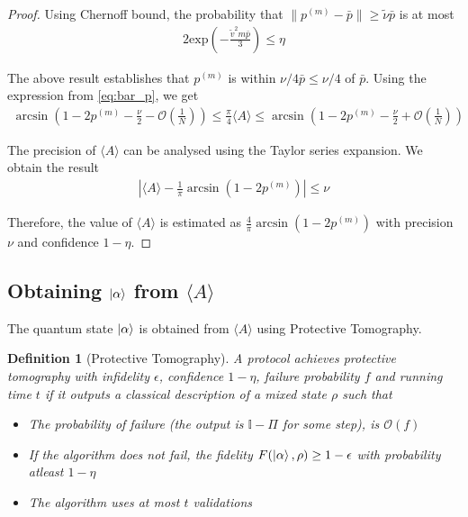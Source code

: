 \documentclass[]{article}
\newtheorem{definition}{Definition}
\newcommand{\cO}{\mathcal O}
\newcommand*{\E}[1]{\langle #1 \rangle}
\begin{document}
\begin{proof}
    Using Chernoff bound, the probability that $\| p^{(m)} - \bar p\| \geq \tilde \nu \bar p$ is at most
    \begin{align}
        2 \text{exp} \left(-\frac{\tilde v^2 m \bar p}{3} \right) \leq \eta
    \end{align}
    
    The above result establishes that $p^{(m)}$ is within $\nu/4 \bar p \leq \nu/4$ of $\bar p$. Using the expression from \ref{eq:bar_p}, we get
    \begin{align}
        \arcsin \left(1 - 2p^{(m)} - \frac{\nu}{2} - \cO \left(\frac{1}{N}\right) \right) \leq \frac{\pi}{4} \E{A} \leq\arcsin \left(1 - 2p^{(m)} - \frac{\nu}{2} + \cO \left(\frac{1}{N}\right) \right)
    \end{align}

    The precision of $\E{A}$ can be analysed using the Taylor series expansion. We obtain the result 
    \begin{align}
        \left\vert \E{A} - \frac{1}{\pi} \arcsin \left(1 - 2 p^{(m)} \right)\right\vert \leq \nu
    \end{align}
    
    Therefore, the value of $\E{A}$ is estimated as $\frac{4}{\pi} \arcsin \left(1 - 2p^{(m)}\right)$ with precision $\nu$ and confidence $1 - \eta$. 
\end{proof}

\subsection{Obtaining $\ket{\alpha}$ from $\E{A}$}
The quantum state $\ket{\alpha}$ is obtained from $\E{A}$ using Protective Tomography.
\begin{definition}[Protective Tomography]
    A protocol achieves protective tomography with infidelity $\epsilon$, confidence $1 - \eta$, failure probability $f$ and running time $t$ if it outputs a classical description of a mixed state $\rho$ such that 
    \begin{itemize}
        \item The probability of failure (the output is $\mathbb I - \Pi$ for some step), is $\mathcal O(f)$
        \item If the algorithm does not fail, the fidelity $F(\ket{\alpha}, \rho) \geq 1 - \epsilon$ with probability atleast $1 - \eta$
        \item The algorithm uses at most $t$ validations
    \end{itemize}
\end{definition}
\end{document}
